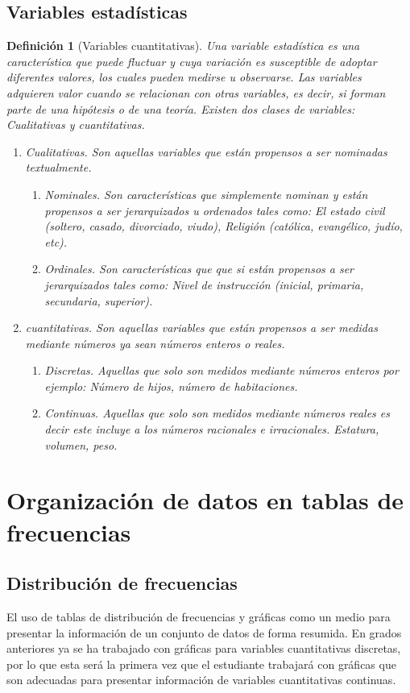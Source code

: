 \documentclass[a4paper]{report}
\newtheorem{defn}[thm]{Definición}
\begin{document}
\subsection{Variables estadísticas}

\begin{defn}[Variables cuantitativas]
  Una variable estadística es una característica que puede fluctuar y cuya variación es susceptible de adoptar diferentes valores, los cuales pueden medirse u observarse. Las variables adquieren valor cuando se relacionan con otras variables, es decir, si forman parte de una hipótesis o de una teoría. Existen dos clases de variables: Cualitativas y cuantitativas.
  \begin{enumerate}
    \item  Cualitativas. Son aquellas variables que están propensos a ser nominadas textualmente.
    \begin{enumerate}
      \item  Nominales. Son características que simplemente nominan y están propensos a ser jerarquizados u ordenados tales como: El estado   civil (soltero, casado, divorciado, viudo), Religión (católica, evangélico, judío, etc).
      \item  Ordinales. Son características que que si están propensos a ser jerarquizados tales como: Nivel de instrucción (inicial, primaria, secundaria, superior).
    \end{enumerate}
    \item  cuantitativas. Son aquellas variables que están propensos a ser medidas mediante números ya sean números enteros o reales.
    \begin{enumerate}
      \item  Discretas. Aquellas que solo son medidos mediante números enteros por ejemplo: Número de hijos, número de habitaciones.
      \item  Continuas. Aquellas que solo son medidos mediante números reales es decir este incluye a los números racionales e irracionales. Estatura, volumen, peso.
    \end{enumerate}
  \end{enumerate}
\end{defn}


\section{Organización de datos en tablas de frecuencias}
\subsection{Distribución de frecuencias}
El uso de tablas de distribución de frecuencias y gráficas como un medio para presentar la información
de un conjunto de datos de forma resumida. En grados anteriores ya se ha trabajado con gráficas para
variables cuantitativas discretas, por lo que esta será la primera vez que el estudiante trabajará con
gráficas que son adecuadas para presentar información de variables cuantitativas continuas.
\end{document}
